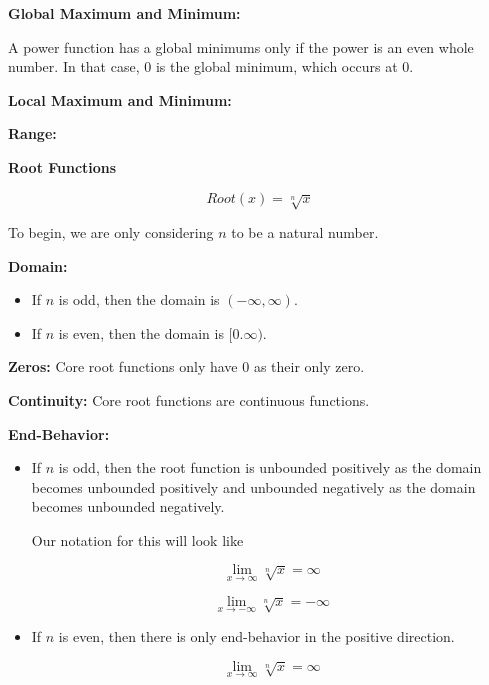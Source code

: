 \documentclass{ximera}
\begin{document}
\begin{explanation}
\textbf{Global Maximum and Minimum:} 

A power function has a global minimums only if the power is an even whole number. In that case, $0$ is the global minimum, which occurs at $0$.

\textbf{Local Maximum and Minimum:} 

\textbf{Range:} 

\end{explanation}










\begin{explanation} \textbf{\textcolor{red!75!green}{Root Functions}} 


\[ Root(x) = \sqrt[n]{x}  \]

To begin, we are only considering $n$ to be a natural number.


\textbf{Domain:} 


\begin{itemize}
\item If $n$ is odd, then the domain is $(-\infty, \infty)$.
\item If $n$ is even, then the domain is $[0. \infty)$.
\end{itemize}


\textbf{Zeros:} Core root functions only have $0$ as their only zero.

\textbf{Continuity:}  Core root functions are continuous functions.

\textbf{End-Behavior:} 


\begin{itemize}
\item If $n$ is odd, then the root function is unbounded positively as the domain becomes unbounded positively and unbounded negatively as the domain becomes unbounded negatively.

Our notation for this will look like 


\[
\lim\limits_{x \to \infty} \sqrt[n]{x} = \infty
\]


\[
\lim\limits_{x \to -\infty} \sqrt[n]{x} = -\infty
\]


\item If $n$ is even, then there is only end-behavior in the positive direction.

\[
\lim\limits_{x \to \infty} \sqrt[n]{x} = \infty
\]



\end{itemize}



\end{explanation}
\end{document}
